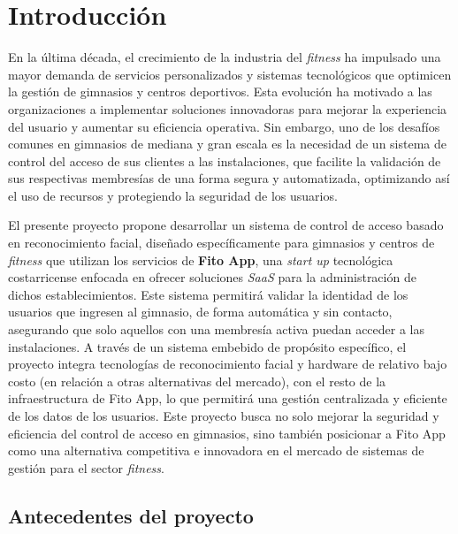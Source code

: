 
\chapter{Introducción}
\label{chp:intro}

En la última década, el crecimiento de la industria del \textit{fitness} ha impulsado una mayor demanda de servicios personalizados y sistemas tecnológicos que optimicen la gestión de gimnasios y centros deportivos. Esta evolución ha motivado a las organizaciones a implementar soluciones innovadoras para mejorar la experiencia del usuario y aumentar su eficiencia operativa. Sin embargo, uno de los desafíos comunes en gimnasios de mediana y gran escala es la necesidad de un sistema de control del acceso de sus clientes a las instalaciones, que facilite la validación de sus respectivas membresías de una forma segura y automatizada, optimizando así el uso de recursos y protegiendo la seguridad de los usuarios.

El presente proyecto propone desarrollar un sistema de control de acceso basado en reconocimiento facial, diseñado específicamente para gimnasios y centros de \textit{fitness} que utilizan los servicios de \textbf{Fito App}, una \textit{start up} tecnológica costarricense enfocada en ofrecer soluciones \textit{SaaS} para la administración de dichos establecimientos. Este sistema permitirá validar la identidad de los usuarios que ingresen al gimnasio, de forma automática y sin contacto, asegurando que solo aquellos con una membresía activa puedan acceder a las instalaciones. A través de un sistema embebido de propósito específico, el proyecto integra tecnologías de reconocimiento facial y hardware de relativo bajo costo (en relación a otras alternativas del mercado), con el resto de la infraestructura de Fito App, lo que permitirá una gestión centralizada y eficiente de los datos de los usuarios. Este proyecto busca no solo mejorar la seguridad y eficiencia del control de acceso en gimnasios, sino también posicionar a Fito App como una alternativa competitiva e innovadora en el mercado de sistemas de gestión para el sector \textit{fitness}. 


\section{Antecedentes del proyecto}

